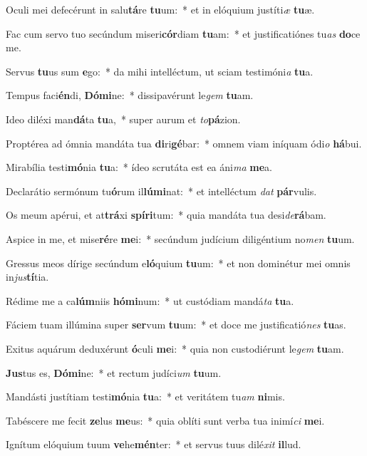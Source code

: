 \item Oculi mei defecérunt in salu\textbf{tá}re \textbf{tu}um:~* et in elóquium justíti\textit{æ} \textbf{tu}æ.
\item Fac cum servo tuo secúndum miseri\textbf{cór}diam \textbf{tu}am:~* et justificatiónes tu\textit{as} \textbf{do}ce me.
\item Servus \textbf{tu}us sum \textbf{e}go:~* da mihi intelléctum, ut sciam testimóni\textit{a} \textbf{tu}a.
\item Tempus faci\textbf{én}di, \textbf{Dó}\textbf{mi}ne:~* dissipavérunt le\textit{gem} \textbf{tu}am.
\item Ideo diléxi man\textbf{dá}ta \textbf{tu}a,~* super aurum et \textit{to}\textbf{pá}zion.
\item Proptérea ad ómnia mandáta tua \textbf{di}ri\textbf{gé}bar:~* omnem viam iníquam ódi\textit{o} \textbf{há}bui.
\item Mirabília testi\textbf{mó}nia \textbf{tu}a:~* ídeo scrutáta est ea áni\textit{ma} \textbf{me}a.
\item Declarátio sermónum tu\textbf{ó}rum il\textbf{lú}\textbf{mi}nat:~* et intelléctum \textit{dat} \textbf{pár}vulis.
\item Os meum apérui, et at\textbf{trá}xi \textbf{spí}\textbf{ri}tum:~* quia mandáta tua desi\textit{de}\textbf{rá}bam.
\item Aspice in me, et mise\textbf{ré}re \textbf{me}i:~* secúndum judícium diligéntium no\textit{men} \textbf{tu}um.
\item Gressus meos dírige secúndum e\textbf{ló}quium \textbf{tu}um:~* et non dominétur mei omnis in\textit{jus}\textbf{tí}tia.
\item Rédime me a ca\textbf{lúm}niis \textbf{hó}\textbf{mi}num:~* ut custódiam mandá\textit{ta} \textbf{tu}a.
\item Fáciem tuam illúmina super \textbf{ser}vum \textbf{tu}um:~* et doce me justificatió\textit{nes} \textbf{tu}as.
\item Exitus aquárum deduxérunt \textbf{ó}culi \textbf{me}i:~* quia non custodiérunt le\textit{gem} \textbf{tu}am.
\item \textbf{Jus}tus es, \textbf{Dó}\textbf{mi}ne:~* et rectum judíci\textit{um} \textbf{tu}um.
\item Mandásti justítiam testi\textbf{mó}nia \textbf{tu}a:~* et veritátem tu\textit{am} \textbf{ni}mis.
\item Tabéscere me fecit \textbf{ze}lus \textbf{me}us:~* quia oblíti sunt verba tua inimí\textit{ci} \textbf{me}i.
\item Ignítum elóquium tuum \textbf{ve}he\textbf{mén}ter:~* et servus tuus dilé\textit{xit} \textbf{il}lud.
